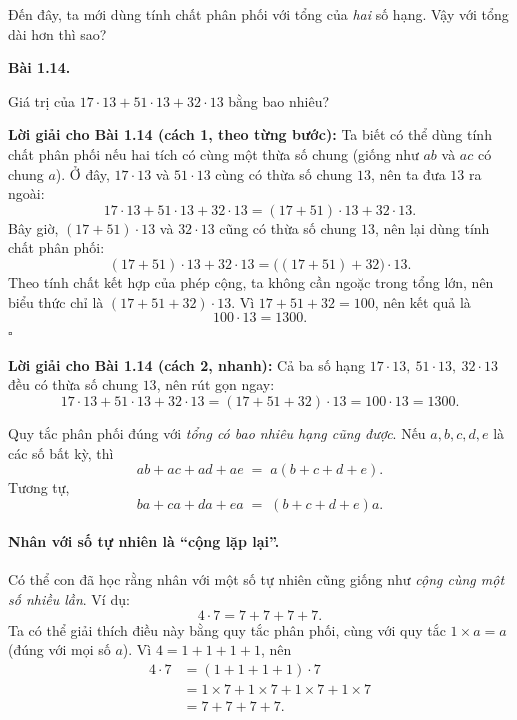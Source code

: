 \documentclass[14pt,a4paper]{extbook}
\newenvironment{problem}[1][]{
  \par\noindent\textbf{Bài #1.}\ \ignorespaces
}{\par}
\begin{document}
Đến đây, ta mới dùng tính chất phân phối với tổng của \emph{hai} số hạng.
Vậy với tổng dài hơn thì sao?

\begin{problem}[1.14]
Giá trị của \(17\cdot13 + 51\cdot13 + 32\cdot13\) bằng bao nhiêu?
\end{problem}

\noindent\textbf{Lời giải cho Bài 1.14 (cách 1, theo từng bước):}
Ta biết có thể dùng tính chất phân phối nếu hai tích có cùng một thừa số
chung (giống như \(ab\) và \(ac\) có chung \(a\)).
Ở đây, \(17\cdot13\) và \(51\cdot13\) cùng có thừa số chung \(13\), nên
ta đưa \(13\) ra ngoài:
\[
17\cdot13 + 51\cdot13 + 32\cdot13
= (17+51)\cdot13 + 32\cdot13.
\]
Bây giờ, \((17+51)\cdot13\) và \(32\cdot13\) cũng có thừa số chung \(13\),
nên lại dùng tính chất phân phối:
\[
(17+51)\cdot13 + 32\cdot13
= \bigl((17+51)+32\bigr)\cdot13.
\]
Theo tính chất kết hợp của phép cộng, ta không cần ngoặc trong tổng lớn,
nên biểu thức chỉ là \((17+51+32)\cdot13\).
Vì \(17+51+32=100\), nên kết quả là
\[
100\cdot13=1300.
\]
\(\square\)

\medskip
\noindent\textbf{Lời giải cho Bài 1.14 (cách 2, nhanh):}
Cả ba số hạng \(17\cdot13,\ 51\cdot13,\ 32\cdot13\) đều có thừa số chung \(13\),
nên rút gọn ngay:
\[
17\cdot13 + 51\cdot13 + 32\cdot13
= (17+51+32)\cdot13
= 100\cdot13
= \boxed{1300}.
\]


\begin{tcolorbox}[colback=blue!3,colframe=blue!60!black,title={Ý tưởng: Phân phối cho tổng nhiều tích}]
Quy tắc phân phối đúng với \emph{tổng có bao nhiêu hạng cũng được}.
Nếu \(a,b,c,d,e\) là các số bất kỳ, thì
\[
ab+ac+ad+ae \;=\; a(b+c+d+e).
\]
Tương tự,
\[
ba+ca+da+ea \;=\; (b+c+d+e)a.
\]
\end{tcolorbox}

\paragraph{Nhân với số tự nhiên là “cộng lặp lại”.}
Có thể con đã học rằng nhân với một số tự nhiên cũng giống như
\emph{cộng cùng một số nhiều lần}. Ví dụ:
\[
4\cdot7 = 7+7+7+7.
\]
Ta có thể giải thích điều này bằng quy tắc phân phối, cùng với
quy tắc \(1\times a=a\) (đúng với mọi số \(a\)). Vì \(4=1+1+1+1\), nên
\[
\begin{aligned}
4\cdot7 &= (1+1+1+1)\cdot7\\
        &= 1\times7 + 1\times7 + 1\times7 + 1\times7\\
        &= 7+7+7+7.
\end{aligned}
\]
\end{document}

